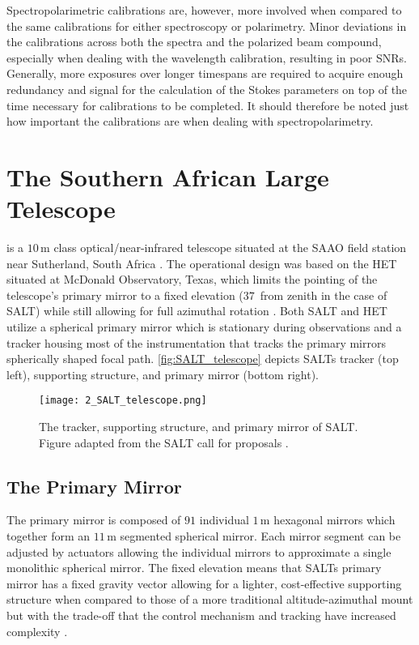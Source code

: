 Spectropolarimetric calibrations are, however, more involved when compared to the same calibrations for either spectroscopy or polarimetry.
Minor deviations in the calibrations across both the spectra and the polarized beam compound, especially when dealing with the wavelength calibration, resulting in poor \glspl{SNR}.
Generally, more exposures over longer timespans are required to acquire enough redundancy and signal for the calculation of the Stokes parameters on top of the time necessary for calibrations to be completed.
It should therefore be noted just how important the calibrations are when dealing with spectropolarimetry.

\section{The Southern African Large Telescope} \label{sec:SALT} %

 is a $10$\,m class optical/near-infrared telescope situated at the \gls{SAAO} field station near Sutherland, South Africa \citep{SALT_optical_design}.
The operational design was based on the \gls{HET} situated at McDonald Observatory, Texas, which limits the pointing of the telescope's primary mirror to a fixed elevation ($37$\degree\ from zenith in the case of \gls{SALT}) while still allowing for full azimuthal rotation \citep{HET}.
Both \gls{SALT} and \gls{HET} utilize a spherical primary mirror which is stationary during observations and a tracker housing most of the instrumentation that tracks the primary mirrors spherically shaped focal path.
\autoref{fig:SALT_telescope} depicts \glspl{SALT} tracker (top left), supporting structure, and primary mirror (bottom right).

\begin{figure}[t]
    \centering
    \texttt{[image: 2\_SALT\_telescope.png]}
    \caption{
        The tracker, supporting structure, and primary mirror of \gls{SALT}.
        Figure adapted from the \gls{SALT} call for proposals \citep{SALT_CFP}.
    }
    \label{fig:SALT_telescope}
\end{figure}

\subsection{The Primary Mirror}

The primary mirror is composed of $91$ individual $1$\,m hexagonal mirrors which together form an $11$\,m segmented spherical mirror.
Each mirror segment can be adjusted by actuators allowing the individual mirrors to approximate a single monolithic spherical mirror.
The fixed elevation means that \glspl{SALT} primary mirror has a fixed gravity vector allowing for a lighter, cost-effective supporting structure when compared to those of a more traditional altitude-azimuthal mount but with the trade-off that the control mechanism and tracking have increased complexity \citep{SALT_design}.

